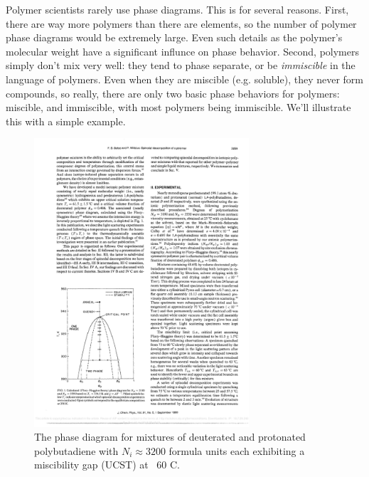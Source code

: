 \documentclass[12pt]{article}
\begin{document}
Polymer scientists rarely use phase diagrams. This is for several reasons. First, there are way more polymers than there are elements, so the number of polymer phase diagrams would be extremely large. Even such details as the polymer's molecular weight have a significant influnce on phase behavior. Second, polymers simply don't mix very well: they tend to phase separate, or be \emph{immiscible} in the language of polymers. Even when they are miscible (e.g. soluble), they never form compounds, so really, there are only two basic phase behaviors for polymers: miscible, and immiscible, with most polymers being immiscible. We'll illustrate this with a simple example. 

\begin{figure}[h]
\centering
\includegraphics[width=8cm]{deuterated_comparing}
\caption{The phase diagram for mixtures of deuterated and protonated polybutadiene with $N_i\approx3200$ formula units each exhibiting a miscibility gap (UCST) at ~60 \degree C.}
\label{deuterated_comparison}
\end{figure}
\end{document}
